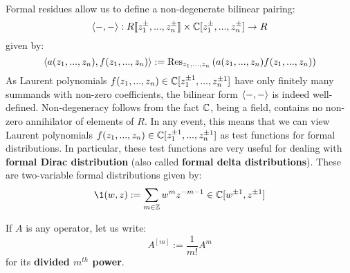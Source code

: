         Formal residues allow us to define a non-degenerate bilinear pairing:
            $$\<-, -\>: R[\![z_1^{\pm}, ..., z_n^{\pm}]\!] \x \bbC[z_1^{\pm}, ..., z_n^{\pm}] \to R$$
        given by:
            $$\langle a(z_1, ..., z_n), f(z_1, ..., z_n) \rangle := \mathrm{Res}_{z_1, ..., z_n} \left( a(z_1, ..., z_n) f(z_1, ..., z_n) \right)$$
        As Laurent polynomials $f(z_1, ..., z_n) \in \mathbb{C}[z_1^{\pm 1}, ..., z_n^{\pm 1}]$ have only finitely many summands with non-zero coefficients, the bilinear form $\langle-, -\rangle$ is indeed well-defined. Non-degeneracy follows from the fact $\mathbb{C}$, being a field, contains no non-zero annihilator of elements of $R$. In any event, this means that we can view Laurent polynomials $f(z_1, ..., z_n) \in \mathbb{C}[z_1^{\pm 1}, ..., z_n^{\pm 1}]$ as test functions for formal distributions. In particular, these test functions are very useful for dealing with \textbf{formal Dirac distribution} (also called \textbf{formal delta distributions}). These are two-variable formal distributions given by:
            $$\1(w, z) := \sum_{m \in \Z} w^m z^{-m - 1} \in \bbC[w^{\pm 1}, z^{\pm 1}]$$
        \begin{convention}
            If $A$ is any operator, let us write:
                $$A^{[m]} := \frac{1}{m!} A^m$$
            for its \textbf{divided $m^{th}$ power}.
        \end{convention}
